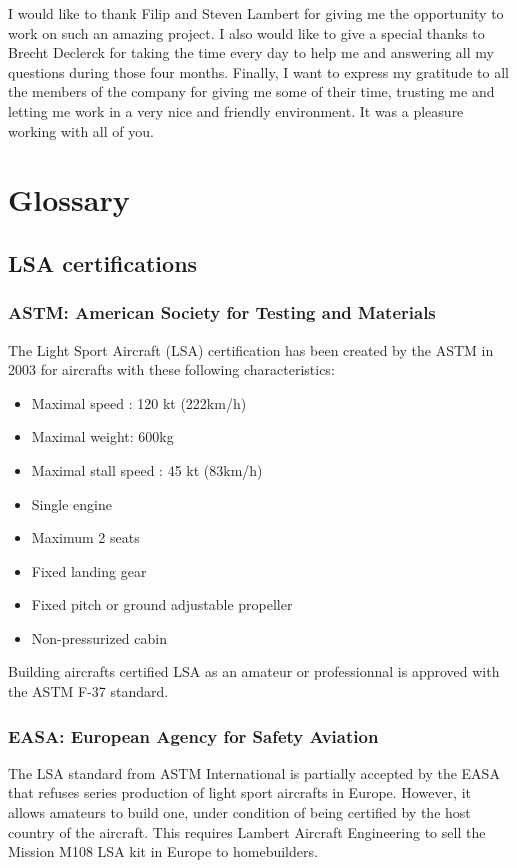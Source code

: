 \documentclass[11pt,a4paper]{article}
\begin{document}
\bigskip

I would like to thank Filip and Steven Lambert for giving me the opportunity to work on such an amazing project. I also would like to give a special thanks to Brecht Declerck for taking the time every day to help me and answering all my questions during those four months. Finally, I want to express my gratitude to all the members of the company for giving me some of their time, trusting me and letting me work in a very nice and friendly environment. It was a pleasure working with all of you.

\newpage

\section{Glossary} 
\subsection{LSA certifications}
\subsubsection{ASTM: American Society for Testing and Materials}
The Light Sport Aircraft (LSA) certification has been created by the ASTM in 2003 for aircrafts with these following characteristics:
\begin{itemize}
\item Maximal speed : 120 kt (222km/h)
\item Maximal weight: 600kg
\item Maximal stall speed : 45 kt (83km/h)
\item Single engine
\item Maximum 2 seats
\item Fixed landing gear
\item Fixed pitch or ground adjustable propeller
\item Non-pressurized cabin
\end{itemize}

\bigskip

Building aircrafts certified LSA as an amateur or professionnal is approved with the ASTM F-37 standard.

\subsubsection{EASA: European Agency for Safety Aviation}
The LSA standard from ASTM International is partially accepted by the EASA that refuses series production of light sport aircrafts in Europe. However, it allows amateurs to build one, under condition of being certified by the host country of the aircraft. This requires Lambert Aircraft Engineering to sell the Mission M108 LSA kit in Europe to homebuilders.
\end{document}

